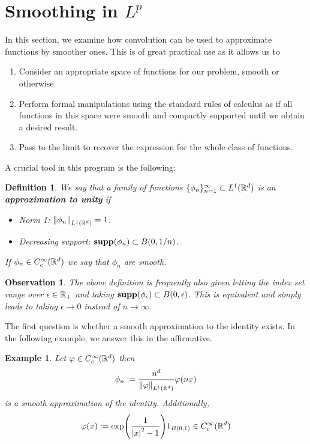 \documentclass[12pt]{article}
\newtheorem{observation}{Observation}
\newtheorem{example}{Example}
\newtheorem{definition}{Definition}
\theoremstyle{remark}
\renewcommand{\norm}[1]{\left\lVert #1 \right\rVert}\renewcommand{\abs}[1]{\left| #1 \right|}
\begin{document}
\section{Smoothing in $L^p$}\label{smooth section}
In this section, we examine how convolution can be used to approximate functions by smoother ones. This is of great practical use as it allows us to
\begin{enumerate}
	\item Consider an appropriate space of functions for our problem, smooth or otherwise.
	\item Perform formal manipulations using the standard rules of calculus as if all functions in this space were smooth and compactly supported until we obtain a desired result.
	\item Pass to the limit to recover the expression for the whole class of functions.
\end{enumerate}
A crucial tool in this program is the following:
\begin{definition}\label{app def}
	We say that a family of functions $\{\phi_n\}_{n= 1}^\infty \subset L^1(\mathbb{R}^d)$ is an \textbf{approximation to unity} if
	\begin{itemize}
		\item Norm 1: $\norm{\phi_n}_{L^1(\R^d)}=1$.
		\item Decreasing support: $\mathbf{supp}(\phi_n) \subset B(0, 1 /n)$.
	\end{itemize}
	If $\phi_n \in C_c^\infty(\mathbb{R}^d)$ we say that $\phi_n$ are smooth.
\end{definition}
\begin{observation}
	The above definition is frequently also given letting the index set range over $\epsilon \in \mathbb{R}_+$ and taking $\mathbf{supp}(\phi_\epsilon ) \subset B(0,\epsilon )$. This is equivalent and simply leads to taking $\epsilon \to 0$ instead of $n \to \infty$. \end{observation}
The first question is whether a smooth approximation to the identity exists. In the following example, we answer this in the affirmative.
\begin{example}
	Let $\varphi \in C_c^\infty(\mathbb{R}^d)$ then
	\begin{align*}
		\phi_n:= \frac{n^d }{\norm{\varphi}_{L^1(\R^d)}}\varphi(nx)
	\end{align*}
	is a smooth approximation of the identity. Additionally,
	\begin{align}\label{bump example}
		\varphi(x):=  \exp({\frac{1}{\abs{x}^2-1}}) 1_{B(0,1)} \in C_c^\infty(\R^d)
	\end{align}
\end{example}
\end{document}
